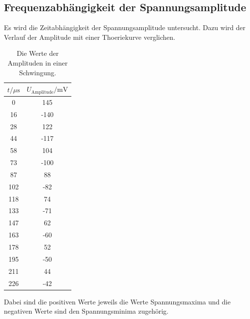 \documentclass[titlepage = firstcover]{scrartcl}
\begin{document}
        \subsection{Frequenzabhängigkeit der Spannungsamplitude}
            Es wird die Zeitabhängigkeit der Spannungsamplitude untersucht. Dazu wird der Verlauf der Amplitude mit einer Thoeriekurve verglichen.
            \begin{table}[h]
                \centering
                \caption{Die Werte der Amplituden in einer Schwingung.}
                \label{tab:Tabelle1}
                \begin{tabular}{c c}
                    \toprule
                    {$t / \mu\text{s}$} & {$U_\text{Amplitude} / \text{mV}$}\\
                    \midrule
                    0  &  145 \\ 
                    16 & -140 \\
                    28 &  122 \\ 
                    44 & -117 \\
                    58 &  104 \\ 
                    73 & -100 \\
                    87 &  88  \\
                    102 & -82 \\
                    118 & 74  \\
                    133 & -71 \\
                    147 & 62  \\
                    163 & -60 \\
                    178 & 52  \\
                    195 & -50 \\
                    211 & 44  \\
                    226 & -42 \\
                    \bottomrule
                \end{tabular}
            \end{table}
            \FloatBarrier
            \noindent
            Dabei sind die positiven Werte jeweils die Werte Spannungsmaxima und die negativen Werte sind den Spannungsminima zugehörig.
\end{document}
